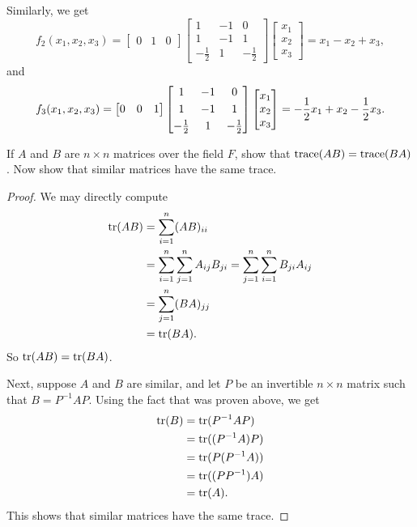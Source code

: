 \begin{solution}
  Similarly, we get
  \begin{equation*}
    f_2(x_1,x_2,x_3) =
    \begin{bmatrix}
      0 & 1 & 0
    \end{bmatrix}
    \begin{bmatrix}
      1 & -1 & 0 \\[3pt]
      1 & -1 & 1 \\[3pt]
      -\frac12 & 1 & -\frac12
    \end{bmatrix}
    \begin{bmatrix}
      x_1 \\ x_2 \\ x_3
    \end{bmatrix}
    = x_1 - x_2 + x_3,
  \end{equation*}
  and
  \begin{equation*}
    f_3(x_1,x_2,x_3) =
    \begin{bmatrix}
      0 & 0 & 1
    \end{bmatrix}
    \begin{bmatrix}
      1 & -1 & 0 \\[3pt]
      1 & -1 & 1 \\[3pt]
      -\frac12 & 1 & -\frac12
    \end{bmatrix}
    \begin{bmatrix}
      x_1 \\ x_2 \\ x_3
    \end{bmatrix}
    = -\frac12x_1 + x_2 - \frac12x_3.
    \qedhere
  \end{equation*}
\end{solution}

\label{exercise:lin-tran:trace-AB-eq-trace-BA}
If $A$ and $B$ are $n\times n$ matrices over the field $F$, show that
$\operatorname{trace}(AB) = \operatorname{trace}(BA)$. Now show that similar matrices have the
same trace.
\begin{proof}
  We may directly compute
  \begin{align*}
    \operatorname{tr}(AB)
    &= \sum_{i=1}^n(AB)_{ii} \\
    &= \sum_{i=1}^n\sum_{j=1}^nA_{ij}B_{ji}
    = \sum_{j=1}^n\sum_{i=1}^nB_{ji}A_{ij} \\
    &= \sum_{j=1}^n(BA)_{jj} \\
    &= \operatorname{tr}(BA).
  \end{align*}
  So $\operatorname{tr}(AB) = \operatorname{tr}(BA)$.

  Next, suppose $A$ and $B$ are similar, and let $P$ be an invertible
  $n\times n$ matrix such that $B = P^{-1}AP$. Using the fact that was
  proven above, we get
  \begin{align*}
    \operatorname{tr}(B)
    &= \operatorname{tr}(P^{-1}AP) \\
    &= \operatorname{tr}((P^{-1}A)P) \\
    &= \operatorname{tr}(P(P^{-1}A)) \\
    &= \operatorname{tr}((PP^{-1})A) \\
    &= \operatorname{tr}(A).
  \end{align*}
  This shows that similar matrices have the same trace.
\end{proof}

